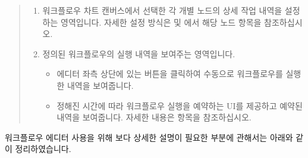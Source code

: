 \documentclass[letterpaper,10pt,english]{sphinxmanual}
\begin{document}
\begin{quote}
\begin{enumerate}
\item {} 
 워크플로우 차트 캔버스에서 선택한 각 개별 노드의 상세 작업 내역을 설정하는 영역입니다. 자세한 설정 방식은 {\hyperref[\detokenize{integrator/part03/tasks:action-nodes}]{}} 및 {\hyperref[\detokenize{integrator/part03/control_flow:control-flow-nodes}]{}}에서 해당 노드 항목을 참조하십시오.

\item {} 
 정의된 워크플로우의 실행 내역을 보여주는 영역입니다.
\begin{itemize}
\item {} 
 에디터 좌측 상단에 있는  버튼을 클릭하여 수동으로 워크플로우를 실행한 내역을 보여줍니다.

\item {} 
 정해진 시간에 따라 워크플로우 실행을 예약하는 UI를 제공하고 예약된 내역을 보여줍니다. 자세한 내용은 {\hyperref[\detokenize{integrator/part03/scheduled_run:scheduled-run}]{}} 항목을 참조하십시오.

\end{itemize}

\end{enumerate}
\end{quote}

워크플로우 에디터 사용을 위해 보다 상세한 설명이 필요한 부분에 관해서는 아래와 같이 정리하였습니다.
\end{document}
